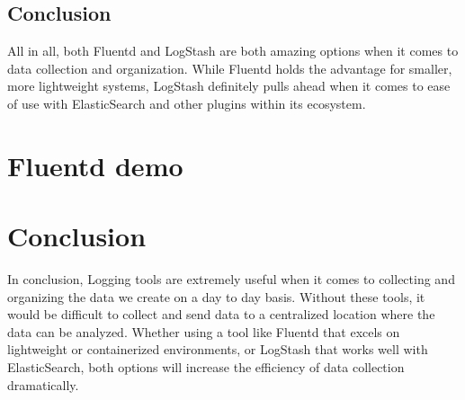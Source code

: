 \subsection{Conclusion}
\quad \quad
All in all, both Fluentd and LogStash are both amazing options when it comes to data collection and organization. While Fluentd holds the advantage for smaller, more lightweight systems, LogStash definitely pulls ahead when it comes to ease of 
use with ElasticSearch and other plugins within its ecosystem.
\section{Fluentd demo} \label{sec:demo}
\quad \quad 
\section{Conclusion} \label{sec:conclude}
\quad \quad 
In conclusion, Logging tools are extremely useful when it comes to collecting and organizing the data we create on a day to day basis. Without these tools, it would be difficult to collect and send data to a centralized location where the data can 
be analyzed. Whether using a tool like Fluentd that excels on lightweight or containerized environments, or LogStash that works well with ElasticSearch, both options will increase the efficiency of data collection dramatically. 
\newpage
\begin{thebibliography}{widest entry}
\end{thebibliography}